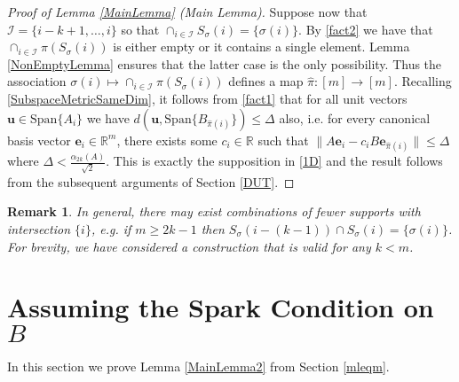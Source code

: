 \documentclass[journal, onecolumn]{IEEEtran}
\newtheorem{remark}{Remark}
\begin{document}
\begin{proof}[Proof of Lemma \ref{MainLemma} (Main Lemma)]
Suppose now that $\mathcal{I} = \{i-k+1, \ldots, i\}$ so that $\cap_{i \in \mathcal{I}} S_\sigma(i) = \{\sigma(i)\}$. By \eqref{fact2} we have that $\cap_{i \in \mathcal{I}} \pi(S_\sigma(i))$ is either empty or it contains a single element. Lemma \ref{NonEmptyLemma} ensures that the latter case is the only possibility. Thus the association $\sigma(i) \mapsto \cap_{i \in \mathcal{I}} \pi(S_\sigma(i))$ defines a map $\hat \pi: [m] \to [m]$. Recalling \eqref{SubspaceMetricSameDim}, it follows from \eqref{fact1} that for all unit vectors $\mathbf{u} \in \text{Span}\{A_{i}\}$ we have $d\left( \mathbf{u}, \text{Span}\{B_{\hat \pi(i)}\}\right) \leq \Delta$ also, i.e. for every canonical basis vector $\mathbf{e}_i \in \mathbb{R}^m$, there exists some $c_i \in \mathbb{R}$ such that $\|A\mathbf{e}_i - c_iB\mathbf{e}_{\hat \pi(i)}\| \leq \Delta$ where $\Delta < \frac{\alpha_{2k}(A)}{\sqrt{2}}$. This is exactly the supposition in \eqref{1D} and the result follows from the subsequent arguments of Section \ref{DUT}. 
\end{proof}

\begin{remark} In general, there may exist combinations of fewer supports with intersection $\{i\}$, e.g. if $m \geq 2k-1$ then $S_\sigma(i - (k-1)) \cap S_\sigma(i) = \{\sigma(i)\}$. For brevity, we have considered a construction that is valid for any $k < m$.
\end{remark}


\section{Assuming the Spark Condition on $B$}\label{mleqmAppendix}

In this section we prove Lemma \ref{MainLemma2} from Section \ref{mleqm}.

\end{document}
